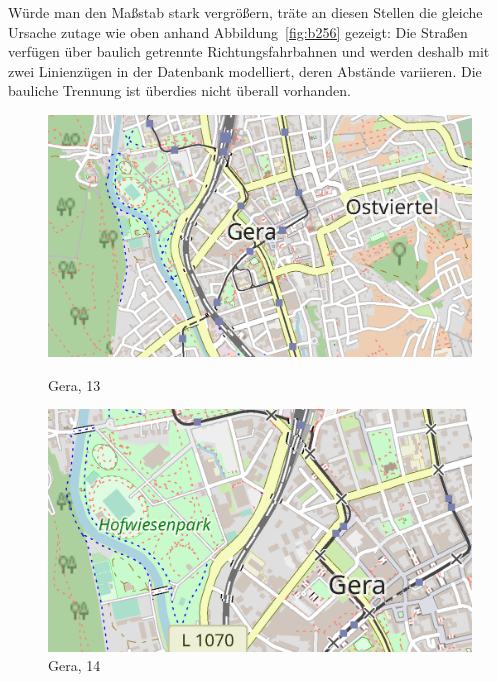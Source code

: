 \documentclass[../main/thesis.tex]{subfiles}
\begin{document}
Würde man den Maßstab stark vergrößern, träte an diesen Stellen die gleiche Ursache zutage wie oben anhand Abbildung~\ref{fig:b256}
gezeigt: Die Straßen verfügen über baulich getrennte Richtungsfahrbahnen und werden deshalb mit zwei Linienzügen in der Datenbank modelliert, deren Abstände variieren.
Die bauliche Trennung ist überdies nicht überall vorhanden.

\begin{figure}[ht]
  \begin{minipage}[t]{.5\linewidth}
    \centering
    \includegraphics[width=\ScaleIfNeeded]{../chapter2/gera-z13}
    \caption{Gera,  13}\label{fig:gera13}
  \end{minipage}%
  \begin{minipage}[t]{.5\linewidth}
    \centering
    \includegraphics[width=\ScaleIfNeeded]{../chapter2/gera-z14}
    \caption{Gera,  14}\label{fig:gera14}
  \end{minipage}
\end{figure}
\end{document}
